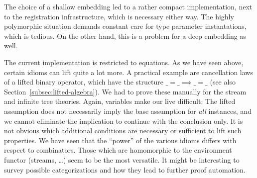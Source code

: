 The choice of a shallow embedding led to a rather compact implementation,
next to the registration infrastructure, which is necessary either way.
The highly polymorphic situation demands constant care for type parameter
instantations, which is tedious.
On the other hand, this is a problem for a deep embedding as well.

The current implementation is restricted to equations.
As we have seen above, certain idioms can lift quite a lot more.
A practical example are cancellation laws of a lifted binary operator, which
have the structure $\_ = \_ \implies \_ = \_$ (see also
Section~\ref{subsec:lifted-algebra}).
We had to prove these manually for the stream and infinite tree theories.
Again, variables make our live difficult:
The lifted assumption does not necessarily imply the base assumption for
\emph{all} instances, and we cannot eliminate the implication to continue
with the conclusion only.
It is not obvious which additional conditions are necessary or sufficient to
lift such properties.
We have seen that the ``power'' of the various idioms differs with respect to
combinators.
Those which are homomorphic to the environment functor (streams, \dots) seem to
be the most versatile.
It might be interesting to survey possible categorizations and how they lead
to further proof automation.
